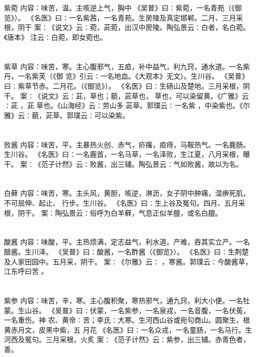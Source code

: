 \documentclass[12pt,UTF8]{ctexbook}
\begin{document}
\section{}紫菀
内容：味苦，温。主咳逆上气，胸中 
《吴普》曰∶紫菀，一名青苑（《御览》）。 
《名医》曰∶一名紫茜，一名青苑。生房陵及真定邯郸。二月、三月采根，阴干 
案∶《说文》云∶菀，茈菀，出汉中房陵。陶弘景云∶白者，名白菀。《唐本》 
注云∶白菀，即女菀也。 


\section{}紫草
内容：味苦，寒。主心腹邪气，五疸，补中益气，利九窍，通水道。一名紫丹，一名紫芙（《御 
览》引云∶一名地血。《大观本》无文）。生川谷。 
《吴普》曰∶紫草节赤。二月花。（《御览》）。 
《名医》曰∶生砀山及楚地。三月采根，阴干。 
案∶《说文》云∶茈，草也；藐，茈草也， 草也，可以染留黄。《广雅》云∶茈 ，茈 
草也。《山海经》云∶劳山多 
茈草。郭璞云∶一名紫 ，中染紫也。《尔雅》云∶藐，茈草。郭璞云∶可以染紫。 


\section{}败酱
内容：味苦，平。主暴热火创、赤气，疥瘙，疸痔，马鞍热气。一名鹿肠。生川谷。 
《名医》曰∶一名鹿首，一名马草，一名泽败，生江夏，八月采根，曝干。 
案∶《范子计然》云∶败酱，出三辅。陶弘景云∶气如败酱，故以为名。 


\section{}白藓
内容：味苦，寒。主头风，黄胆，咳逆，淋沥，女子阴中肿痛，湿痹死肌，不可屈伸、起止、 
行步。生川谷。 
《名医》曰∶生上谷及冤句。四月、五月采根，阴干。 
案∶陶弘景云∶俗呼为白羊藓，气息正似羊膻，或名白膻。 


\section{}酸酱
内容：味酸，平。主热烦满，定志益气，利水道。产难，吞其实立产。一名醋酱。生川泽。 
《吴普》曰∶酸酱，一名酢酱（《御览》）。 
《名医》曰∶生荆楚及人家田园中。五月采，阴干。 
案∶《尔雅》云∶ ，寒酱。郭璞云∶今酸酱草，江东呼曰苦 。 


\section{}紫参
内容：味苦，辛，寒。主心腹积聚，寒热邪气，通九窍，利大小便。一名牡蒙。生山谷。 
《吴普》曰∶伏蒙，一名紫参，一名泉戎，一名音腹，一名伏菟，一名重伤。神 
农、黄帝∶苦；李氏∶大寒。生河西山谷或宛句商山。圆聚生，根黄赤月文，皮黑中紫，五 
月花 
《名医》曰∶一名众戎，一名童肠，一名马行。生河西及冤句。三月采根，火炙 
案∶《范子计然》云∶紫参，出三辅。赤青色者，善。 
\end{document}

